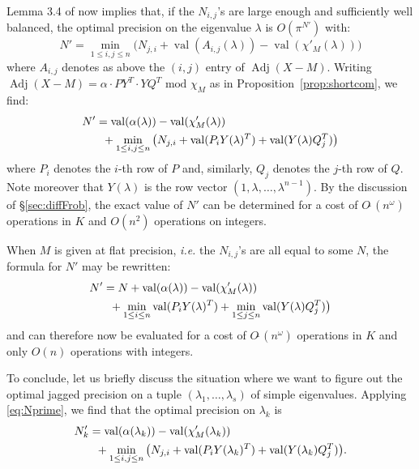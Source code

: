\documentclass[sigconf]{acmart}
\DeclareMathOperator{\val}{val}
\DeclareMathOperator{\adj}{Adj}
\newcommand{\softO}{O\tilde{~}}
\theoremstyle{definition}
\begin{document}
\noindent
Lemma 3.4 of \cite{caruso-roe-vaccon:14a} now implies that, if the
$N_{i,j}$'s are large enough and sufficiently well balanced, the optimal
precision on the eigenvalue $\lambda$ is $O(\pi^{N'})$ with:
$$N' = \min_{1 \leq i, j\leq n} \big(N_{j,i} + \val(A_{i,j}(\lambda)) - 
\val(\chi'_M(\lambda))\big)$$
where $A_{i,j}$ denotes as above the $(i,j)$ entry of $\adj(X{-}M)$.
Writing
$\adj(X{-}M) = \alpha \cdot P Y^T \cdot Y Q^T \text{ mod } \chi_M$
as in Proposition~\ref{prop:shortcom}, we find:
\begin{align}
N' & = \val(\alpha(\lambda)) - \val(\chi'_M(\lambda)) \nonumber \\
& \hspace{2mm} + \min_{1 \leq i, j\leq n} \big(N_{j,i} + 
\val(P_i Y(\lambda)^T) + \val(Y(\lambda) Q_j^T)\big) \label{eq:Nprime}
\end{align}
where $P_i$ denotes the $i$-th row of $P$ and, similarly, $Q_j$
denotes the $j$-th row of $Q$. Note moreover that $Y(\lambda)$ is
the row vector $(1, \lambda, \ldots, \lambda^{n-1})$.
By the discussion of \S \ref{sec:diffFrob}, the exact value of $N'$ can be 
determined for a cost of $\softO(n^\omega)$ operations in $K$ and
$O(n^2)$ operations on integers. 

When $M$ is given at flat precision, \emph{i.e.} the $N_{i,j}$'s are all 
equal to some $N$, the formula for $N'$ may be rewritten:
\begin{align}
N' & = N + \val(\alpha(\lambda)) - \val(\chi'_M(\lambda)) \nonumber \\
& \hspace{2mm} + \min_{1 \leq i \leq n} \val(P_i Y(\lambda)^T)
+ \min_{1 \leq j \leq n} \val(Y(\lambda) Q_j^T)\big) \label{eq:Nprimeflat}
\end{align}
and can therefore now be evaluated for a cost of $\softO(n^\omega)$
operations in $K$ and only $O(n)$ operations with integers.

\medskip

To conclude, let us briefly discuss the situation where we want
to figure out the optimal jagged precision on a tuple $(\lambda_1,
\ldots, \lambda_s)$ of simple eigenvalues. Applying \eqref{eq:Nprime},
we find that the optimal precision on $\lambda_k$ is 
\begin{align*}
N'_k & = \val(\alpha(\lambda_k)) - \val(\chi'_M(\lambda_k)) \\
& \hspace{2mm} + \min_{1 \leq i, j\leq n} \big(N_{j,i} + 
\val(P_i Y(\lambda_k)^T) + \val(Y(\lambda_k) Q_j^T)\big).
\end{align*}
\end{document}
